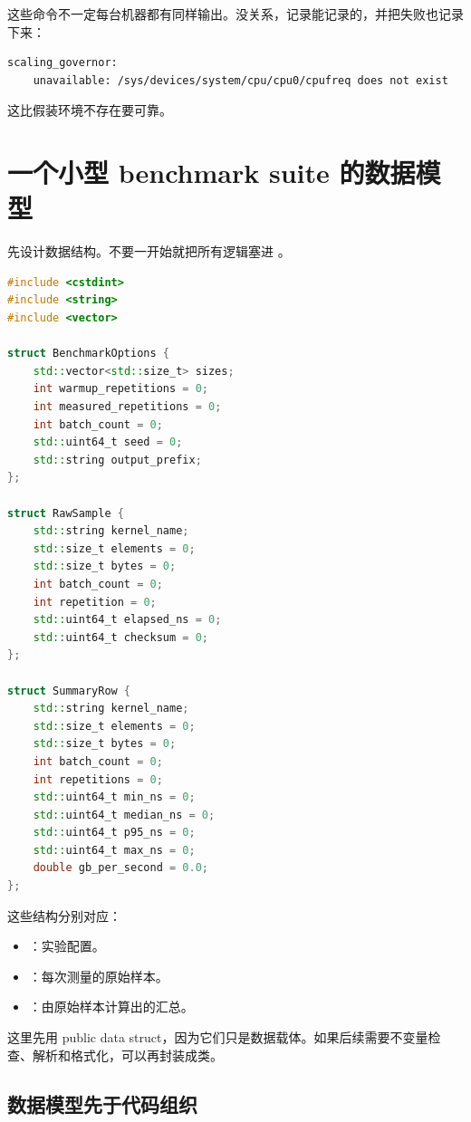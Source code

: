 这些命令不一定每台机器都有同样输出。没关系，记录能记录的，并把失败也记录下来：

\begin{lstlisting}
scaling_governor:
    unavailable: /sys/devices/system/cpu/cpu0/cpufreq does not exist
\end{lstlisting}

这比假装环境不存在要可靠。

\section{一个小型 benchmark suite 的数据模型}

先设计数据结构。不要一开始就把所有逻辑塞进 。

\begin{lstlisting}[language=C++]
#include <cstdint>
#include <string>
#include <vector>

struct BenchmarkOptions {
    std::vector<std::size_t> sizes;
    int warmup_repetitions = 0;
    int measured_repetitions = 0;
    int batch_count = 0;
    std::uint64_t seed = 0;
    std::string output_prefix;
};

struct RawSample {
    std::string kernel_name;
    std::size_t elements = 0;
    std::size_t bytes = 0;
    int batch_count = 0;
    int repetition = 0;
    std::uint64_t elapsed_ns = 0;
    std::uint64_t checksum = 0;
};

struct SummaryRow {
    std::string kernel_name;
    std::size_t elements = 0;
    std::size_t bytes = 0;
    int batch_count = 0;
    int repetitions = 0;
    std::uint64_t min_ns = 0;
    std::uint64_t median_ns = 0;
    std::uint64_t p95_ns = 0;
    std::uint64_t max_ns = 0;
    double gb_per_second = 0.0;
};
\end{lstlisting}

这些结构分别对应：

\begin{itemize}
  \item {}：实验配置。
  \item {}：每次测量的原始样本。
  \item {}：由原始样本计算出的汇总。
\end{itemize}

这里先用 public data struct，因为它们只是数据载体。如果后续需要不变量检查、解析和格式化，可以再封装成类。

\subsection{数据模型先于代码组织}


